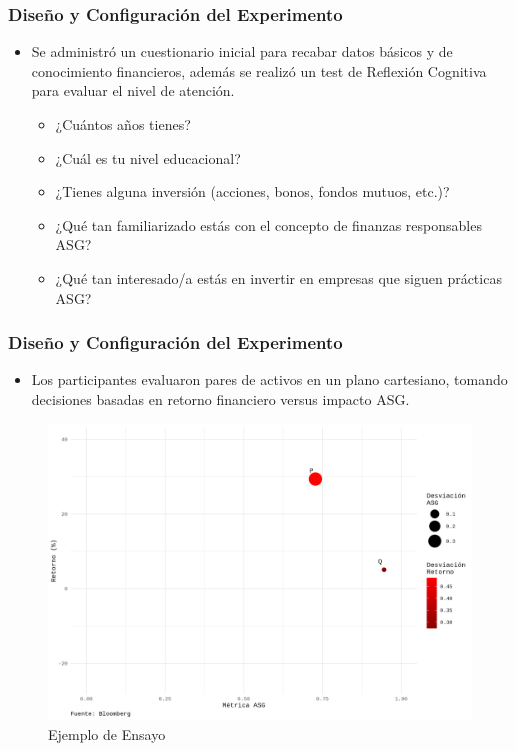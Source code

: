 \documentclass{beamer}
\begin{document}
\begin{frame}
    \frametitle{Diseño y Configuración del Experimento}
    \begin{itemize}
        \item Se administró un cuestionario inicial para recabar datos básicos y de conocimiento financieros, además se realizó un test de Reflexión Cognitiva para evaluar el nivel de atención.
        
        \begin{itemize}
            \item ¿Cuántos años tienes?
            \item ¿Cuál es tu nivel educacional?
            
            \item ¿Tienes alguna inversión (acciones, bonos, fondos mutuos, etc.)?
            \item ¿Qué tan familiarizado estás con el concepto de finanzas responsables ASG?
            \item ¿Qué tan interesado/a estás en invertir en empresas que siguen prácticas ASG?
        \end{itemize}
    \end{itemize}
\end{frame}

\begin{frame}
    \frametitle{Diseño y Configuración del Experimento}
    \begin{itemize}
        \item Los participantes evaluaron pares de activos en un plano cartesiano, tomando decisiones basadas en retorno financiero versus impacto ASG.
    \end{itemize}
    \begin{figure}
        \centering
        \includegraphics[width=0.65\linewidth]{plot_4YTD.png}
        \caption{Ejemplo de Ensayo}
    \end{figure}
\end{frame}
\end{document}
